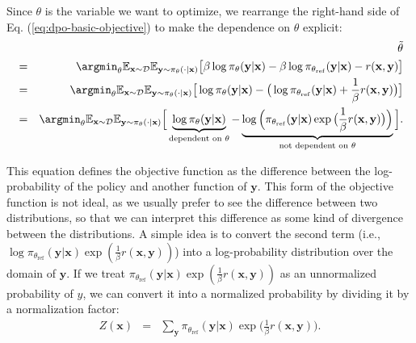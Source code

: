 Since $\theta$ is the variable we want to optimize, we rearrange the right-hand side of Eq. (\ref{eq:dpo-basic-objective}) to make the dependence on $\theta$ explicit:
\begin{eqnarray}
&    & \tilde{\theta} \nonumber \\
& = & \argmin_{\theta} \mathbb{E}_{\mathbf{x} \sim \mathcal{D}} \mathbb{E}_{\mathbf{y} \sim \pi_{\theta}(\cdot|\mathbf{x})} \big[ \beta \log \pi_{\theta}(\mathbf{y}|\mathbf{x}) - \beta \log \pi_{\theta_{\mathrm{ref}}}(\mathbf{y}|\mathbf{x}) - r(\mathbf{x},\mathbf{y}) \big] \nonumber \\
& = & \argmin_{\theta} \mathbb{E}_{\mathbf{x} \sim \mathcal{D}} \mathbb{E}_{\mathbf{y} \sim \pi_{\theta}(\cdot|\mathbf{x})} \big[ \log \pi_{\theta}(\mathbf{y}|\mathbf{x}) - \big(\log \pi_{\theta_{\mathrm{ref}}}(\mathbf{y}|\mathbf{x}) + \frac{1}{\beta} r(\mathbf{x},\mathbf{y}) \big) \big] \nonumber \\
& = & \argmin_{\theta} \mathbb{E}_{\mathbf{x} \sim \mathcal{D}} \mathbb{E}_{\mathbf{y} \sim \pi_{\theta}(\cdot|\mathbf{x})} \Big[ \underbrace{\log \pi_{\theta}(\mathbf{y}|\mathbf{x})}_{\text{dependent on $\theta$}} - \underbrace{\log \Big(\pi_{\theta_{\mathrm{ref}}}(\mathbf{y}|\mathbf{x}) \exp \big(\frac{1}{\beta} r(\mathbf{x},\mathbf{y}) \big) \Big)}_{\text{not dependent on $\theta$}} \Big].
\label{eq:dpo-raw-objective-with-no-normalization}
\end{eqnarray}

This equation defines the objective function as the difference between the log-probability of the policy and another function of $\mathbf{y}$. This form of the objective function is not ideal, as we usually prefer to see the difference between two distributions, so that we can interpret this difference as some kind of divergence between the distributions. A simple idea is to convert the second term (i.e., $ \log \pi_{\theta_{\mathrm{ref}}}(\mathbf{y}|\mathbf{x}) \exp(\frac{1}{\beta} r(\mathbf{x},\mathbf{y}))$) into a log-probability distribution over the domain of $\mathbf{y}$. If we treat $ \pi_{\theta_{\mathrm{ref}}}(\mathbf{y}|\mathbf{x}) \exp(\frac{1}{\beta} r(\mathbf{x},\mathbf{y}))$ as an unnormalized probability of $y$, we can convert it into a normalized probability by dividing it by a normalization factor:
\begin{eqnarray}
Z(\mathbf{x}) & = & \sum_{\mathbf{y}} \pi_{\theta_{\mathrm{ref}}}(\mathbf{y}|\mathbf{x}) \exp \big(\frac{1}{\beta} r(\mathbf{x},\mathbf{y}) \big).
\end{eqnarray}


